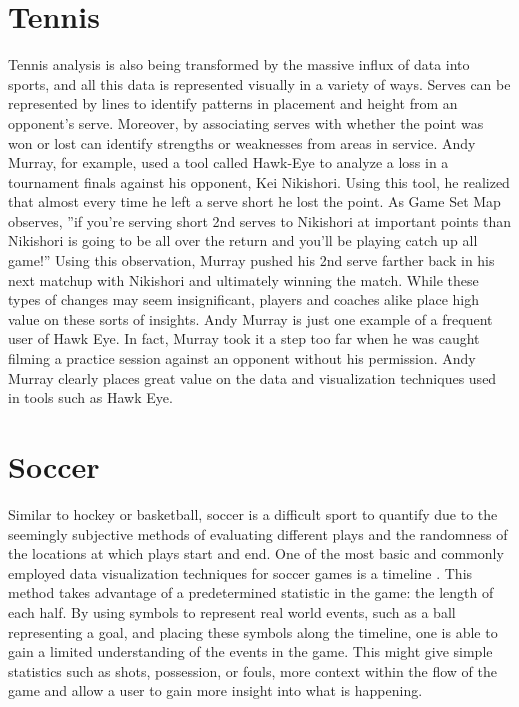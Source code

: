 \documentclass[sigconf]{acmart}
\begin{document}
\section{Tennis}

Tennis analysis is also being transformed by the massive influx of data into sports, and all this data is represented visually in a variety of ways. Serves can be represented by lines to identify patterns in placement and height from an opponent's serve. Moreover, by associating serves with whether the point was won or lost can identify strengths or weaknesses from areas in service. Andy Murray, for example, used a tool called Hawk-Eye to analyze a loss in a tournament finals against his opponent, Kei Nikishori. Using this tool, he realized that almost every time he left a serve short he lost the point. As Game Set Map observes, ''if you're serving short 2nd serves to Nikishori at important points than Nikishori is going to be all over the return and you'll be playing catch up all game!''\cite{GameSetMap} Using this observation, Murray pushed his 2nd serve farther back in his next matchup with Nikishori and ultimately winning the match. While these types of changes may seem insignificant, players and coaches alike place high value on these sorts of insights. Andy Murray is just one example of a frequent user of Hawk Eye. In fact, Murray took it a step too far when he was caught filming a practice session against an opponent without his permission.\cite{GameSetMap} Andy Murray clearly places great value on the data and visualization techniques used in tools such as Hawk Eye.

\section{Soccer}

Similar to hockey or basketball, soccer is a difficult sport to quantify due to the seemingly subjective methods of evaluating different plays and the randomness of the locations at which plays start and end. One of the most basic and commonly employed data visualization techniques for soccer games is a timeline \cite{SoccerStories}. This method takes advantage of a predetermined statistic in the game: the length of each half. By using symbols to represent real world events, such as a ball representing a goal, and placing these symbols along the timeline, one is able to gain a limited understanding of the events in the game. This might give simple statistics such as shots, possession, or fouls, more context within the flow of the game and allow a user to gain more insight into what is happening. 
\end{document}
